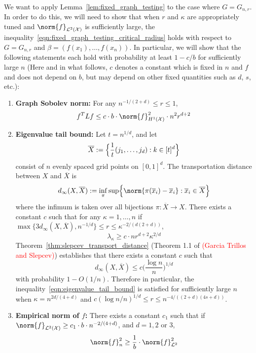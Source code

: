 \documentclass{article}
\newcommand{\1}{\mathbf{1}}
\newcommand{\Xset}{\mathcal{X}}
\newcommand{\Leb}{\mathcal{L}}
\newcommand{\ol}[1]{\overline{#1}}
\theoremstyle{alden}
\theoremstyle{aldenthm}
\theoremstyle{definition}
\theoremstyle{remark}
\begin{document}
We want to apply Lemma~\ref{lem:fixed_graph_testing} to the case where $G = G_{n,r}$. In order to do this, we will need to show that when $r$ and $\kappa$ are appropriately tuned and $\norm{f}_{\Leb^2(\mathcal{X})}$ is sufficiently large, the inequality~\eqref{eqn:fixed_graph_testing_critical_radius} holds with respect to $G = G_{n,r}$ and $\beta = (f(x_1),\ldots,f(x_n))$. In particular, we will show that the following statements each hold with probability at least $1 - c/b$ for sufficiently large $n$ (Here and in what follows, $c$ denotes a constant which is fixed in $n$ and $f$ and does not depend on $b$, but may depend on other fixed quantities such as $d$, $s$, etc.): 
\begin{enumerate}[label=(E\arabic*)]
	\item 
	\label{event:discrete_sobolev_norm_order1}
	\textbf{Graph Sobolev norm:} For any $n^{-1/(2 + d)}\leq r \leq 1$,
	\begin{equation}
	\label{eqn:continuous_to_discrete_sobolev_norm_order1}
	f^T L f \leq c \cdot b \cdot \norm{f}_{H^1(\Xset)}^2 \cdot n^{2} r^{d + 2} 
	\end{equation}
	\item 
	\label{event:eigenvalue_tail_decay}
	\textbf{Eigenvalue tail bound:} Let $t = n^{1/d}$, and let
	\begin{equation*}
	\overline{X} := \Bigl\{\frac{1}{t}(j_1,\ldots,j_d): k \in [t]^d\Bigr\}
	\end{equation*} 
	consist of $n$ evenly spaced grid points on $[0,1]^d$. The transportation distance between $X$ and $\ol{X}$ is
	\begin{equation*}
	d_{\infty}(X,\overline{X}) := \inf_{\pi} \sup\Bigl\{\norm{\pi(\ol{x}_i) - \ol{x}_i}: \ol{x}_i \in \ol{X}\Bigr\}
	\end{equation*}
	where the infimum is taken over all bijections $\pi: \ol{X} \to X$. 
	There exists a constant $c$ such that for any $\kappa = 1,\ldots,n$ if $\max\{ 3 d_{\infty}(X,\ol{X}),n^{-1/d}\} \leq r \leq \kappa^{-2/(d(2 +d))}$, 
	\begin{equation}
	\label{eqn:eigenvalue_tail_bound}
	\lambda_{\kappa} \geq c \cdot n r^{d + 2} \kappa^{2/d}
	\end{equation}
	Theorem~\ref{thm:slepcev_transport_distance} (Theorem 1.1 of \textcolor{red}{(Garcia Trillos and Slepcev)}) establishes that there exists a constant $c$ such that 
	\begin{equation*}
	d_{\infty}(X,\ol{X}) \leq c\biggl(\frac{\log n}{n}\biggr)^{1/d}
	\end{equation*}
	with probability $1  - O(1/n)$. Therefore in particular, the inequality~\eqref{eqn:eigenvalue_tail_bound} is satisfied for sufficiently large $n$ when $\kappa = n^{2d/(4 + d)}$ and $c(\log n/n)^{1/d} \leq r \leq n^{-4/((2+d)(4s + d))}$. 
	\item 
	\label{event:l2_norm}
	\textbf{Empirical norm of $f$:} There exists a constant $c_1$ such that if $\norm{f}_{\Leb^2(\Xset)} \geq c_1 \cdot b \cdot n^{-2/(4 + d)}$, and $d = 1,2$ or $3$,
	\begin{equation}
	\label{eqn:l2_to_empirical_norm}
	\norm{f}_n^2 \geq \frac{1}{b} \cdot \norm{f}_{\Leb^2}^2
	\end{equation}
\end{enumerate} 
\end{document}
